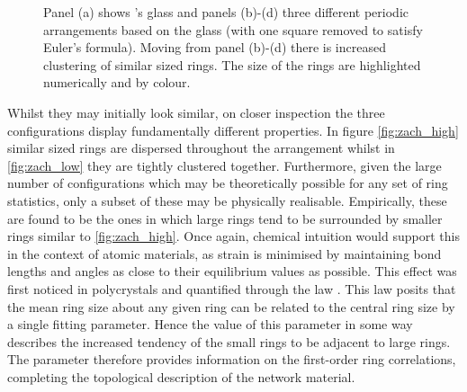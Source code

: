 \begin{figure}[h]
     \caption{Panel (a) shows \zach's glass and panels (b)\--(d) three different periodic arrangements based on the glass (with one square removed to satisfy Euler's formula). Moving from panel (b)\--(d) there is increased clustering of similar sized rings. The size of the rings are highlighted numerically and by colour.}
     \label{fig:zach}
\end{figure}

Whilst they may initially look similar, on closer inspection the three configurations display fundamentally different properties.
In figure \ref{fig:zach_high} similar sized rings are dispersed throughout the arrangement whilst in \ref{fig:zach_low} they are tightly clustered together.
Furthermore, given the large number of configurations which may be theoretically possible for any set of ring statistics, only a subset of these may be physically realisable.
Empirically, these are found to be the ones in which large rings tend to be surrounded by smaller rings \ie{} similar to \ref{fig:zach_high}.
Once again, chemical intuition would support this in the context of atomic materials, as strain is minimised by maintaining bond lengths and angles as close to their equilibrium values as possible.
This effect was first noticed in polycrystals and quantified through the \aw{} law \cite{Aboav1970,Weaire1974}.
This law posits that the mean ring size about any given ring can be related to the central ring size by a single fitting parameter.
Hence the value of this parameter in some way describes the increased tendency of the small rings to be adjacent to large rings.
The \aw{} parameter therefore provides information on the first\--order ring correlations, completing the topological description of the network material.

